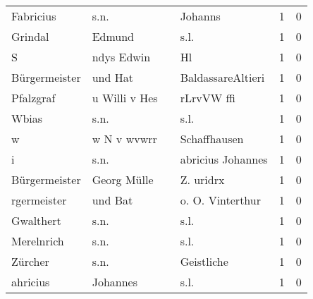 \begin{tabular}{llllrr}
                Fabricius &                               s.n. &             &                                     Johanns &          1 &         0 \\
                  Grindal &                             Edmund &             &                                        s.l. &          1 &         0 \\
                        S &                         ndys Edwin &             &                                          Hl &          1 &         0 \\
            Bürgermeister &                            und Hat &             &                           BaldassareAltieri &          1 &         0 \\
                Pfalzgraf &                      u Willi v Hes &             &                                  rLrvVW ffi &          1 &         0 \\
                    Wbias &                               s.n. &             &                                        s.l. &          1 &         0 \\
                        w &                        w N v wvwrr &             &                                Schaffhausen &          1 &         0 \\
                        i &                               s.n. &             &                           abricius Johannes &          1 &         0 \\
            Bürgermeister &                        Georg Mülle &             &                                   Z. uridrx &          1 &         0 \\
              rgermeister &                            und Bat &             &                            o. O. Vinterthur &          1 &         0 \\
                Gwalthert &                               s.n. &             &                                        s.l. &          1 &         0 \\
               Merelnrich &                               s.n. &             &                                        s.l. &          1 &         0 \\
                  Zürcher &                               s.n. &             &                                  Geistliche &          1 &         0 \\
                 ahricius &                           Johannes &             &                                        s.l. &          1 &         0 \\

\end{tabular}
